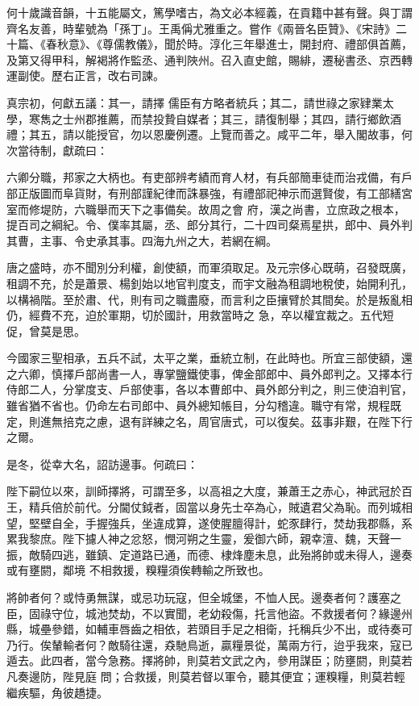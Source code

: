 \begin{pinyinscope}
 何十歲識音韻，十五能屬文，篤學嗜古，為文必本經義，在貢籍中甚有聲。與丁謂齊名友善，時輩號為「孫丁」。王禹偁尤雅重之。嘗作《兩晉名臣贊》、《宋詩》二十篇、《春秋意》、《尊儒教儀》，聞於時。淳化三年舉進士，開封府、禮部俱首薦，及第又得甲科，解褐將作監丞、通判陜州。召入直史館，賜緋，遷秘書丞、京西轉運副使。歷右正言，改右司諫。



 真宗初，何獻五議：其一，請擇
 儒臣有方略者統兵；其二，請世祿之家肄業太學，寒雋之士州郡推薦，而禁投贄自媒者；其三，請復制舉；其四，請行鄉飲酒禮；其五，請以能授官，勿以恩慶例遷。上覽而善之。咸平二年，舉入閣故事，何次當待制，獻疏曰：



 六卿分職，邦家之大柄也。有吏部辨考績而育人材，有兵部簡車徒而治戎備，有戶部正版圖而阜貨財，有刑部謹紀律而誅暴強，有禮部祀神示而選賢俊，有工部繕宮室而修堤防，六職舉而天下之事備矣。故周之會
 府，漢之尚書，立庶政之根本，提百司之綱紀。令、僕率其屬，丞、郎分其行，二十四司粲焉星拱，郎中、員外判其曹，主事、令史承其事。四海九州之大，若網在綱。



 唐之盛時，亦不聞別分利權，創使額，而軍須取足。及元宗侈心既萌，召發既廣，租調不充，於是蕭景、楊釗始以地官判度支，而宇文融為租調地稅使，始開利孔，以構禍階。至於肅、代，則有司之職盡廢，而言利之臣攘臂於其間矣。於是叛亂相仍，經費不充，迫於軍期，切於國計，用救當時之
 急，卒以權宜裁之。五代短促，曾莫是思。



 今國家三聖相承，五兵不試，太平之業，垂統立制，在此時也。所宜三部使額，還之六卿，慎擇戶部尚書一人，專掌鹽鐵使事，俾金部郎中、員外郎判之。又擇本行侍郎二人，分掌度支、戶部使事，各以本曹郎中、員外郎分判之，則三使洎判官，雖省猶不省也。仍命左右司郎中、員外總知帳目，分勾稽違。職守有常，規程既定，則進無掊克之慮，退有詳練之名，周官唐式，可以復矣。茲事非艱，在陛下行之爾。



 是冬，從幸大名，詔訪邊事。何疏曰：



 陛下嗣位以來，訓師擇將，可謂至多，以高祖之大度，兼蕭王之赤心，神武冠於百王，精兵倍於前代。分閫仗鉞者，固當以身先士卒為心，賊遺君父為恥。而列城相望，堅壁自全，手握強兵，坐違成算，遂使腥膻得計，蛇豕肆行，焚劫我郡縣，系累我黎庶。陛下攄人神之忿怒，憫河朔之生靈，爰御六師，親幸澶、魏，天聲一振，敵騎四逃，雖鎮、定道路已通，而德、棣烽塵未息，此殆將帥或未得人，邊奏或有壅閼，鄰境
 不相救援，糗糧須俟轉輸之所致也。



 將帥者何？或恃勇無謀，或忌功玩寇，但全城堡，不恤人民。邊奏者何？護塞之臣，固祿守位，城池焚劫，不以實聞，老幼殺傷，托言他盜。不救援者何？緣邊州縣，城壘參錯，如輔車唇齒之相依，若頭目手足之相衛，托稱兵少不出，或待奏可乃行。俟輦輸者何？敵騎往還，猋馳鳥逝，贏糧景從，萬兩方行，迨乎我來，寇已遁去。此四者，當今急務。擇將帥，則莫若文武之內，參用謀臣；防壅閼，則莫若凡奏邊防，陛見庭
 問；合救援，則莫若督以軍令，聽其便宜；運糗糧，則莫若輕繼疾驅，角彼趫捷。




\end{pinyinscope}
